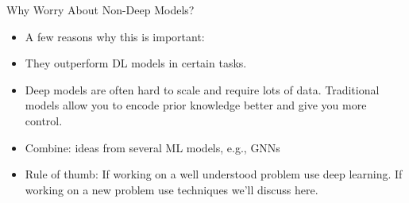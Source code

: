 \begin{frame}{Why Worry About Non-Deep Models?}
            \begin{itemize}
                \item A few reasons why this is important:
                \item They outperform DL models in certain tasks.
                \item Deep models are often hard to scale and require lots of data. Traditional models allow you to encode prior knowledge better and give you more control.
                \item Combine: ideas from several ML models, e.g., GNNs
                \item Rule of thumb: If working on a well understood problem use deep learning. If working on a new problem use techniques we’ll discuss here.
            \end{itemize}
\end{frame}
